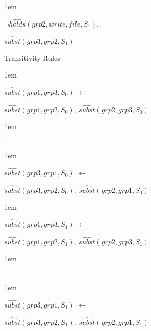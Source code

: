 \documentclass[glov2,twocolumn,final]{svjour2}
\newenvironment{vquote}
  {\begin{list}{}{\leftmargin 1em}\item[]}
  {\end{list}}
\begin{document}
\begin{enumerate}
\begin{vquote}
           \hspace{1em}
           $\lnot \hat{holds}(grp2, write, file, S_{1})$,

           \hspace{1em}
           $\hat{subst}(grp3, grp2, S_{1})$
         \end{vquote}

       \item
         Transitivity Rules

         \begin{vquote}
           $\hat{subst}(grp1, grp3, S_{0})$ $\leftarrow$

           \hspace{1em}
           $\hat{subst}(grp1, grp2, S_{0})$,
           $\hat{subst}(grp2, grp3, S_{0})$
         \end{vquote}

         \begin{vquote}
           \hspace{2em}$\vdots$
         \end{vquote}

         \begin{vquote}
           $\hat{subst}(grp3, grp1, S_{0})$ $\leftarrow$

           \hspace{1em}
           $\hat{subst}(grp3, grp2, S_{0})$,
           $\hat{subst}(grp2, grp1, S_{0})$
         \end{vquote}

         \begin{vquote}
           $\hat{subst}(grp1, grp3, S_{1})$ $\leftarrow$

           \hspace{1em}
           $\hat{subst}(grp1, grp2, S_{1})$,
           $\hat{subst}(grp2, grp3, S_{1})$
         \end{vquote}

         \begin{vquote}
           \hspace{2em}$\vdots$
         \end{vquote}

         \begin{vquote}
           $\hat{subst}(grp3, grp1, S_{1})$ $\leftarrow$

           \hspace{1em}
           $\hat{subst}(grp3, grp2, S_{1})$,
           $\hat{subst}(grp2, grp1, S_{1})$
         \end{vquote}


\end{enumerate}
\end{document}
